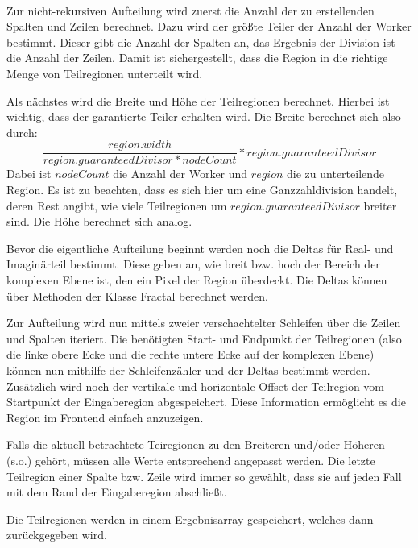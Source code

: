 \paragraph*{} \label{lastbalancierung_naiv}
Zur nicht-rekursiven Aufteilung wird zuerst die Anzahl der zu erstellenden Spalten und Zeilen berechnet.
Dazu wird der größte Teiler der Anzahl der Worker bestimmt. Dieser gibt die Anzahl der Spalten an, das Ergebnis der Division ist die Anzahl der Zeilen.
Damit ist sichergestellt, dass die Region in die richtige Menge von Teilregionen unterteilt wird.

Als nächstes wird die Breite und Höhe der Teilregionen berechnet. Hierbei ist wichtig, dass der garantierte Teiler erhalten wird.
Die Breite berechnet sich also durch:
\begin{equation*}
	\frac{region.width}{region.guaranteedDivisor * nodeCount} * region.guaranteedDivisor
\end{equation*}
Dabei ist $nodeCount$ die Anzahl der Worker und $region$ die zu unterteilende Region.
Es ist zu beachten, dass es sich hier um eine Ganzzahldivision handelt, deren Rest angibt, wie viele Teilregionen um $region.guaranteedDivisor$ breiter sind.
Die Höhe berechnet sich analog.

Bevor die eigentliche Aufteilung beginnt werden noch die Deltas für Real- und Imaginärteil bestimmt.
Diese geben an, wie breit bzw. hoch der Bereich der komplexen Ebene ist, den ein Pixel der Region überdeckt.
Die Deltas können über Methoden der Klasse Fractal berechnet werden.

Zur Aufteilung wird nun mittels zweier verschachtelter Schleifen über die Zeilen und Spalten iteriert.
Die benötigten Start- und Endpunkt der Teilregionen (also die linke obere Ecke und die rechte untere Ecke auf der komplexen Ebene) können nun mithilfe der Schleifenzähler und der Deltas bestimmt werden.
Zusätzlich wird noch der vertikale und horizontale Offset der Teilregion vom Startpunkt der Eingaberegion abgespeichert. Diese Information ermöglicht es die Region im Frontend einfach anzuzeigen.

Falls die aktuell betrachtete Teiregionen zu den Breiteren und/oder Höheren (s.o.) gehört, müssen alle Werte entsprechend angepasst werden.
Die letzte Teilregion einer Spalte bzw. Zeile wird immer so gewählt, dass sie auf jeden Fall mit dem Rand der Eingaberegion abschließt.

Die Teilregionen werden in einem Ergebnisarray gespeichert, welches dann zurückgegeben wird.

